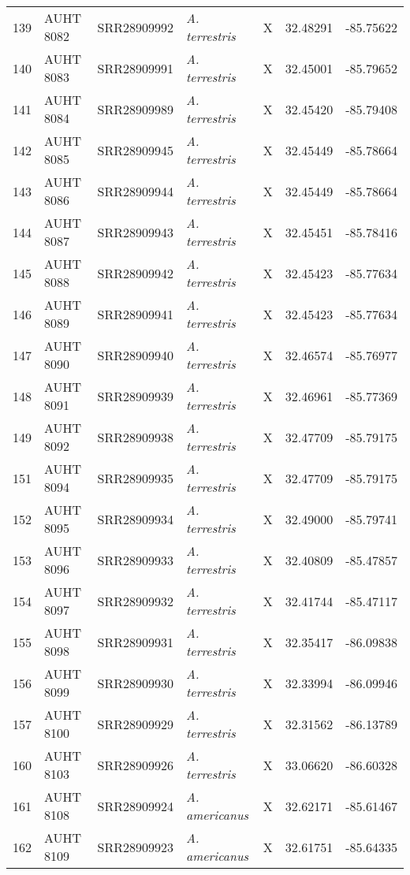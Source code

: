 \begin{longtable}{ lllllll }
139 & AUHT 8082 & SRR28909992 & \textit{A. terrestris} & X & 32.48291 & -85.75622 \\ 
140 & AUHT 8083 & SRR28909991 & \textit{A. terrestris} & X & 32.45001 & -85.79652 \\ 
141 & AUHT 8084 & SRR28909989 & \textit{A. terrestris} & X & 32.45420 & -85.79408 \\ 
142 & AUHT 8085 & SRR28909945 & \textit{A. terrestris} & X & 32.45449 & -85.78664 \\ 
143 & AUHT 8086 & SRR28909944 & \textit{A. terrestris} & X & 32.45449 & -85.78664 \\ 
144 & AUHT 8087 & SRR28909943 & \textit{A. terrestris} & X & 32.45451 & -85.78416 \\ 
145 & AUHT 8088 & SRR28909942 & \textit{A. terrestris} & X & 32.45423 & -85.77634 \\ 
146 & AUHT 8089 & SRR28909941 & \textit{A. terrestris} & X & 32.45423 & -85.77634 \\ 
147 & AUHT 8090 & SRR28909940 & \textit{A. terrestris} & X & 32.46574 & -85.76977 \\ 
148 & AUHT 8091 & SRR28909939 & \textit{A. terrestris} & X & 32.46961 & -85.77369 \\ 
149 & AUHT 8092 & SRR28909938 & \textit{A. terrestris} & X & 32.47709 & -85.79175 \\ 
151 & AUHT 8094 & SRR28909935 & \textit{A. terrestris} & X & 32.47709 & -85.79175 \\ 
152 & AUHT 8095 & SRR28909934 & \textit{A. terrestris} & X & 32.49000 & -85.79741 \\ 
153 & AUHT 8096 & SRR28909933 & \textit{A. terrestris} & X & 32.40809 & -85.47857 \\ 
154 & AUHT 8097 & SRR28909932 & \textit{A. terrestris} & X & 32.41744 & -85.47117 \\ 
155 & AUHT 8098 & SRR28909931 & \textit{A. terrestris} & X & 32.35417 & -86.09838 \\ 
156 & AUHT 8099 & SRR28909930 & \textit{A. terrestris} & X & 32.33994 & -86.09946 \\ 
157 & AUHT 8100 & SRR28909929 & \textit{A. terrestris} & X & 32.31562 & -86.13789 \\ 
160 & AUHT 8103 & SRR28909926 & \textit{A. terrestris} & X & 33.06620 & -86.60328 \\ 
161 & AUHT 8108 & SRR28909924 & \textit{A. americanus} & X & 32.62171 & -85.61467 \\ 
162 & AUHT 8109 & SRR28909923 & \textit{A. americanus} & X & 32.61751 & -85.64335 \\ 

\end{longtable}
